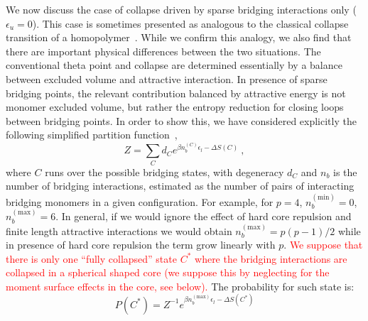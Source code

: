 \documentclass[
preprint,
a4paper,
12pt,
superscriptaddress,
pre]{revtex4}
\newcommand{\rev}[1]{\textcolor{red}{#1}}
\begin{document}
%

We now discuss the case of collapse driven by sparse bridging
interactions only ($\epsilon_u = 0$). This case is sometimes presented
as analogous to the classical collapse transition of a
homopolymer~\cite{Barbieri2013a}. While we confirm this analogy, we
also find that there are important physical differences between the
two situations. The conventional theta point and collapse are
determined essentially by a balance between excluded volume and
attractive interaction. In presence of sparse bridging points, the
relevant contribution balanced by attractive energy is not monomer
excluded volume, but rather the entropy reduction for closing loops
between bridging points. In order to show this, we have considered
explicitly the following simplified partition
function~\cite{Marenduzzo2006c,Saiz2006a},
\begin{equation}
  \label{eq:Zloop}
  Z = \sum_{C} d_C e^{\beta n_b^{(C)} \epsilon_l - \Delta S(C)} \ ,
\end{equation}
where $C$ runs over the possible bridging states, with degeneracy
$d_C$
and $n_b$ is the number of bridging interactions, estimated as the
number of pairs of interacting bridging monomers in a given
configuration. For example, for $p=4$, $n_b^{\mathrm{(min)}}=0$,
$n_b^{\mathrm{(max)}}=6$. In general, if we would ignore the effect of
hard core repulsion and finite length attractive interactions we would
obtain $n_b^{\mathrm{(max)}}=p(p-1)/2$ while in presence of hard core
repulsion the term grow linearly with $p$.
%
\rev{We suppose that there is only one ``fully collapsed'' state $C^*$
where the bridging interactions are collapsed in a spherical shaped
core (we suppose this by neglecting for the moment surface effects in
the core, see below).} The probability for such state is:
\begin{equation}
  \label{eq:prob_collapseZ}
  P(C^*) = Z^{-1}  e^{\beta n_b^{\mathrm{(max)}} \epsilon_l - \Delta S(C^*)}
\end{equation}
\end{document}
